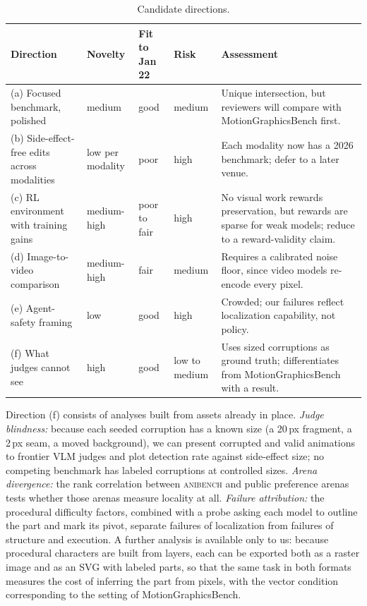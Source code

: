 \documentclass[11pt]{article}
\newcommand{\anibench}{\textsc{anibench}}
\begin{document}
\begin{table}[t]
\centering
\small
\setlength{\tabcolsep}{3pt}
\begin{tabularx}{\linewidth}{>{\raggedright\arraybackslash}p{4.2cm}lllL}
\toprule
Direction & Novelty & Fit to Jan 22 & Risk & Assessment \\
\midrule
(a) Focused benchmark, polished & medium & good & medium & Unique intersection, but reviewers will compare with MotionGraphicsBench first. \\
(b) Side-effect-free edits across modalities & low per modality & poor & high & Each modality now has a 2026 benchmark; defer to a later venue. \\
(c) RL environment with training gains & medium-high & poor to fair & high & No visual work rewards preservation, but rewards are sparse for weak models; reduce to a reward-validity claim. \\
(d) Image-to-video comparison & medium-high & fair & medium & Requires a calibrated noise floor, since video models re-encode every pixel. \\
(e) Agent-safety framing & low & good & high & Crowded; our failures reflect localization capability, not policy. \\
(f) What judges cannot see & high & good & low to medium & Uses sized corruptions as ground truth; differentiates from MotionGraphicsBench with a result. \\
\bottomrule
\end{tabularx}
\caption{Candidate directions.}
\label{tab:dir}
\end{table}

Direction (f) consists of analyses built from assets already in place. \emph{Judge blindness:} because each seeded corruption has a known size (a 20\,px fragment, a 2\,px seam, a moved background), we can present corrupted and valid animations to frontier VLM judges and plot detection rate against side-effect size; no competing benchmark has labeled corruptions at controlled sizes. \emph{Arena divergence:} the rank correlation between \anibench{} and public preference arenas tests whether those arenas measure locality at all. \emph{Failure attribution:} the procedural difficulty factors, combined with a probe asking each model to outline the part and mark its pivot, separate failures of localization from failures of structure and execution. A further analysis is available only to us: because procedural characters are built from layers, each can be exported both as a raster image and as an SVG with labeled parts, so that the same task in both formats measures the cost of inferring the part from pixels, with the vector condition corresponding to the setting of MotionGraphicsBench.
\end{document}
